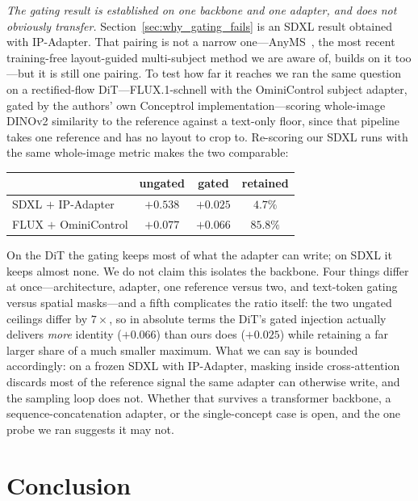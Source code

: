 \documentclass[review,10pt,times]{elsarticle}
\begin{document}
\noindent\textit{The gating result is established on one backbone and one
adapter, and does not obviously transfer.}
Section~\ref{sec:why_gating_fails} is an SDXL result obtained with
IP-Adapter.  That pairing is not a narrow one---AnyMS~\cite{yu2025anyms},
the most recent training-free layout-guided multi-subject method we are aware
of, builds on it too---but it is still one pairing.  To test how far it reaches we ran the same question on a
rectified-flow DiT---FLUX.1-schnell with the OminiControl subject adapter,
gated by the authors' own Conceptrol implementation---scoring whole-image
DINOv2 similarity to the reference against a text-only floor, since that
pipeline takes one reference and has no layout to crop to.  Re-scoring our
SDXL runs with the same whole-image metric makes the two comparable:

\begin{center}\small
\begin{tabular}{lccc}
\toprule
 & ungated & gated & retained \\
\midrule
SDXL $+$ IP-Adapter      & $+0.538$ & $+0.025$ & $4.7\%$ \\
FLUX $+$ OminiControl    & $+0.077$ & $+0.066$ & $85.8\%$ \\
\bottomrule
\end{tabular}
\end{center}

\noindent
On the DiT the gating keeps most of what the adapter can write; on SDXL it
keeps almost none.  We do not claim this isolates the backbone.  Four things
differ at once---architecture, adapter, one reference versus two, and
text-token gating versus spatial masks---and a fifth complicates the ratio
itself: the two ungated ceilings differ by $7\times$, so in absolute terms
the DiT's gated injection actually delivers \emph{more} identity ($+0.066$)
than ours does ($+0.025$) while retaining a far larger share of a much
smaller maximum.  What we can say is bounded accordingly: on a frozen SDXL
with IP-Adapter, masking inside cross-attention discards most of the
reference signal the same adapter can otherwise write, and the sampling
loop does not.  Whether that survives a transformer backbone, a
sequence-concatenation adapter, or the single-concept case is open, and the
one probe we ran suggests it may not.

\section{Conclusion}
\label{sec:conclusion}
\end{document}

